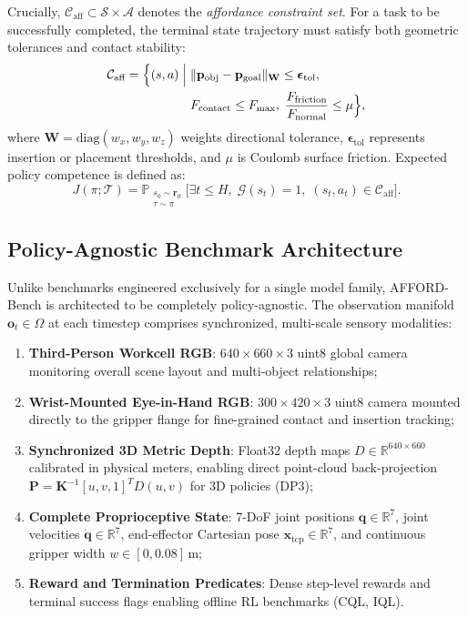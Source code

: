 \documentclass[conference]{IEEEtran}
\begin{document}
Crucially, $\mathcal{C}_{\text{aff}} \subset \mathcal{S} \times \mathcal{A}$ denotes the \textit{affordance constraint set}. For a task to be successfully completed, the terminal state trajectory must satisfy both geometric tolerances and contact stability:
\begin{align}
\mathcal{C}_{\text{aff}} = \Big\{ (s, a) \;\Big|\;& \|\mathbf{p}_{\text{obj}} - \mathbf{p}_{\text{goal}}\|_{\mathbf{W}} \le \boldsymbol{\epsilon}_{\text{tol}}, \notag \\
& F_{\text{contact}} \le F_{\max}, \; \frac{F_{\text{friction}}}{F_{\text{normal}}} \le \mu \Big\},
\end{align}
where $\mathbf{W} = \text{diag}(w_x, w_y, w_z)$ weights directional tolerance, $\boldsymbol{\epsilon}_{\text{tol}}$ represents insertion or placement thresholds, and $\mu$ is Coulomb surface friction. Expected policy competence is defined as:
\begin{equation}
J(\pi; \mathcal{T}) = \mathbb{P}_{\substack{s_0 \sim \mathbf{r}_0 \\ \tau \sim \pi}} \Big[ \exists t \le H, \; \mathcal{G}(s_t) = 1, \; (s_t, a_t) \in \mathcal{C}_{\text{aff}} \Big].
\end{equation}

\subsection{Policy-Agnostic Benchmark Architecture}
Unlike benchmarks engineered exclusively for a single model family, AFFORD-Bench is architected to be completely policy-agnostic. The observation manifold $\mathbf{o}_t \in \Omega$ at each timestep comprises synchronized, multi-scale sensory modalities:
\begin{enumerate}
    \item \textbf{Third-Person Workcell RGB}: $640 \times 660 \times 3$ uint8 global camera monitoring overall scene layout and multi-object relationships;
    \item \textbf{Wrist-Mounted Eye-in-Hand RGB}: $300 \times 420 \times 3$ uint8 camera mounted directly to the gripper flange for fine-grained contact and insertion tracking;
    \item \textbf{Synchronized 3D Metric Depth}: Float32 depth maps $D \in \mathbb{R}^{640 \times 660}$ calibrated in physical meters, enabling direct point-cloud back-projection $\mathbf{P} = \mathbf{K}^{-1} [u, v, 1]^T D(u, v)$ for 3D policies (DP3);
    \item \textbf{Complete Proprioceptive State}: 7-DoF joint positions $\mathbf{q} \in \mathbb{R}^7$, joint velocities $\dot{\mathbf{q}} \in \mathbb{R}^7$, end-effector Cartesian pose $\mathbf{x}_{\text{tcp}} \in \mathbb{R}^7$, and continuous gripper width $w \in [0, 0.08]\,\text{m}$;
    \item \textbf{Reward and Termination Predicates}: Dense step-level rewards and terminal success flags enabling offline RL benchmarks (CQL, IQL).
\end{enumerate}
\end{document}
